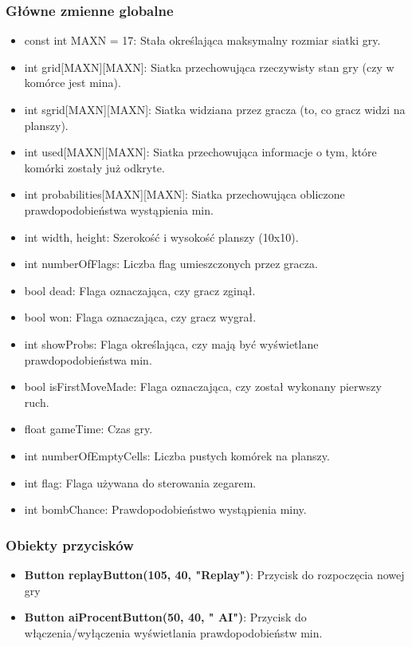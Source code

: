 \documentclass[a4paper, 10pt]{article}
\begin{document}
\subsubsection{Główne zmienne globalne}
\begin{itemize}
	\item const int MAXN = 17: Stała określająca maksymalny rozmiar siatki gry.
	\item int grid[MAXN][MAXN]{}: Siatka przechowująca rzeczywisty stan gry (czy w komórce jest mina).
	\item int sgrid[MAXN][MAXN]{}: Siatka widziana przez gracza (to, co gracz widzi na planszy).
	\item int used[MAXN][MAXN]{}: Siatka przechowująca informacje o tym, które komórki zostały już odkryte.
	\item int probabilities[MAXN][MAXN]: Siatka przechowująca obliczone prawdopodobieństwa wystąpienia min.
	\item int width, height: Szerokość i wysokość planszy (10x10).
	\item int numberOfFlags: Liczba flag umieszczonych przez gracza.
	\item bool dead: Flaga oznaczająca, czy gracz zginął.
	\item bool won: Flaga oznaczająca, czy gracz wygrał.
	\item int showProbs: Flaga określająca, czy mają być wyświetlane prawdopodobieństwa min.
	\item bool isFirstMoveMade: Flaga oznaczająca, czy został wykonany pierwszy ruch.
	\item float gameTime: Czas gry.
	\item int numberOfEmptyCells: Liczba pustych komórek na planszy.
	\item int flag: Flaga używana do sterowania zegarem.
	\item int bombChance: Prawdopodobieństwo wystąpienia miny.
\end{itemize}

\subsubsection{Obiekty przycisków}
\begin{itemize}
	\item \textbf{Button replayButton(105, 40, "Replay")}: Przycisk do rozpoczęcia nowej gry
	\item \textbf{Button aiProcentButton(50, 40, " AI")}: Przycisk do włączenia/wyłączenia wyświetlania prawdopodobieństw min.
\end{itemize}
\end{document}
